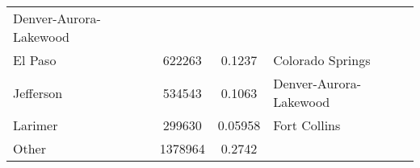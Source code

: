 \documentclass[]{article}
\begin{document}
\begin{longtable}[]{@{}lccl@{}}
\begin{minipage}[t]{0.34\columnwidth}
Denver-Aurora-Lakewood\strut
\end{minipage}\tabularnewline
\begin{minipage}[t]{0.13\columnwidth}\raggedright\strut
El Paso\strut
\end{minipage} & \begin{minipage}[t]{0.21\columnwidth}\centering\strut
622263\strut
\end{minipage} & \begin{minipage}[t]{0.20\columnwidth}\centering\strut
0.1237\strut
\end{minipage} & \begin{minipage}[t]{0.34\columnwidth}\raggedright\strut
Colorado Springs\strut
\end{minipage}\tabularnewline
\begin{minipage}[t]{0.13\columnwidth}\raggedright\strut
Jefferson\strut
\end{minipage} & \begin{minipage}[t]{0.21\columnwidth}\centering\strut
534543\strut
\end{minipage} & \begin{minipage}[t]{0.20\columnwidth}\centering\strut
0.1063\strut
\end{minipage} & \begin{minipage}[t]{0.34\columnwidth}\raggedright\strut
Denver-Aurora-Lakewood\strut
\end{minipage}\tabularnewline
\begin{minipage}[t]{0.13\columnwidth}\raggedright\strut
Larimer\strut
\end{minipage} & \begin{minipage}[t]{0.21\columnwidth}\centering\strut
299630\strut
\end{minipage} & \begin{minipage}[t]{0.20\columnwidth}\centering\strut
0.05958\strut
\end{minipage} & \begin{minipage}[t]{0.34\columnwidth}\raggedright\strut
Fort Collins\strut
\end{minipage}\tabularnewline
\begin{minipage}[t]{0.13\columnwidth}\raggedright\strut
Other\strut
\end{minipage} & \begin{minipage}[t]{0.21\columnwidth}\centering\strut
1378964\strut
\end{minipage} & \begin{minipage}[t]{0.20\columnwidth}\centering\strut
0.2742\strut
\end{minipage} & \begin{minipage}[t]{0.34\columnwidth}\raggedright\strut

\end{minipage}
\end{longtable}
\end{document}
